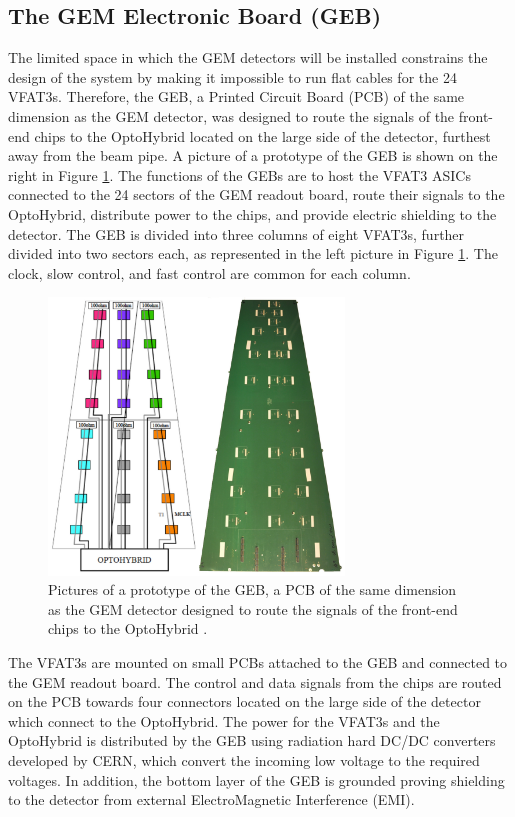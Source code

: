     \subsection{The GEM Electronic Board (GEB)}

      The limited space in which the GEM detectors will be installed constrains the design of the system by making it impossible to run flat cables for the 24 VFAT3s. Therefore, the GEB, a Printed Circuit Board (PCB) of the same dimension as the GEM detector, was designed to route the signals of the front-end chips to the OptoHybrid located on the large side of the detector, furthest away from the beam pipe. A picture of a prototype of the GEB is shown on the right in Figure \ref{fig:II-2-geb}. The functions of the GEBs are to host the VFAT3 ASICs connected to the 24 sectors of the GEM readout board, route their signals to the OptoHybrid, distribute power to the chips, and provide electric shielding to the detector. The GEB is divided into three columns of eight VFAT3s, further divided into two sectors each, as represented in the left picture in Figure \ref{fig:II-2-geb}. The clock, slow control, and fast control are common for each column. \\

      \begin{figure}[b!]
        \centering
        \includegraphics[width=0.7\textwidth]{img/II-2-daq/geb.jpg}
        \caption{Pictures of a prototype of the GEB, a PCB of the same dimension as the GEM detector designed to route the signals of the front-end chips to the OptoHybrid \cite{Colaleo:2021453}.}
        \label{fig:II-2-geb}
      \end{figure}

      The VFAT3s are mounted on small PCBs attached to the GEB and connected to the GEM readout board. The control and data signals from the chips are routed on the PCB towards four connectors located on the large side of the detector which connect to the OptoHybrid. The power for the VFAT3s and the OptoHybrid is distributed by the GEB using radiation hard DC/DC converters developed by CERN, which convert the incoming low voltage to the required voltages. In addition, the bottom layer of the GEB is grounded proving shielding to the detector from external ElectroMagnetic Interference (EMI).

